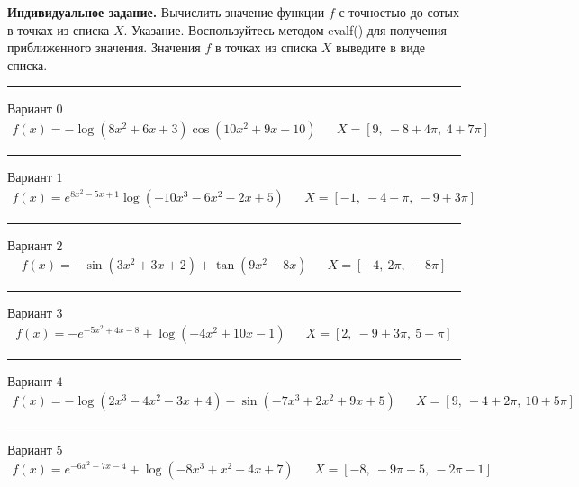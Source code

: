 \documentclass[11pt]{report}
\begin{document}
\pagestyle{empty}
{\bf Индивидуальное задание.}
Вычислить значение функции $f$ с точностью до сотых в точках из списка $X$.
Указание. Воспользуйтесь методом evalf() для получения приближенного значения. Значения $f$ в точках из списка $X$ выведите в виде списка.

\begin{center}
    \noindent\rule{8cm}{0.4pt}
\end{center}
Вариант \(0\)
\begin{align*}
    f(x) = - \log{\left(8 x^{2} + 6 x + 3 \right)} \cos{\left(10 x^{2} + 9 x + 10 \right)} && X = \left[ 9, \  -8 + 4 \pi, \  4 + 7 \pi\right]
\end{align*}
\begin{center}
    \noindent\rule{8cm}{0.4pt}
\end{center}
Вариант \(1\)
\begin{align*}
    f(x) = e^{8 x^{2} - 5 x + 1} \log{\left(- 10 x^{3} - 6 x^{2} - 2 x + 5 \right)} && X = \left[ -1, \  -4 + \pi, \  -9 + 3 \pi\right]
\end{align*}
\begin{center}
    \noindent\rule{8cm}{0.4pt}
\end{center}
Вариант \(2\)
\begin{align*}
    f(x) = - \sin{\left(3 x^{2} + 3 x + 2 \right)} + \tan{\left(9 x^{2} - 8 x \right)} && X = \left[ -4, \  2 \pi, \  - 8 \pi\right]
\end{align*}
\begin{center}
    \noindent\rule{8cm}{0.4pt}
\end{center}
Вариант \(3\)
\begin{align*}
    f(x) = - e^{- 5 x^{2} + 4 x - 8} + \log{\left(- 4 x^{2} + 10 x - 1 \right)} && X = \left[ 2, \  -9 + 3 \pi, \  5 - \pi\right]
\end{align*}
\begin{center}
    \noindent\rule{8cm}{0.4pt}
\end{center}
Вариант \(4\)
\begin{align*}
    f(x) = - \log{\left(2 x^{3} - 4 x^{2} - 3 x + 4 \right)} - \sin{\left(- 7 x^{3} + 2 x^{2} + 9 x + 5 \right)} && X = \left[ 9, \  -4 + 2 \pi, \  10 + 5 \pi\right]
\end{align*}
\begin{center}
    \noindent\rule{8cm}{0.4pt}
\end{center}
Вариант \(5\)
\begin{align*}
    f(x) = e^{- 6 x^{2} - 7 x - 4} + \log{\left(- 8 x^{3} + x^{2} - 4 x + 7 \right)} && X = \left[ -8, \  - 9 \pi - 5, \  - 2 \pi - 1\right]
\end{align*}
\end{document}
